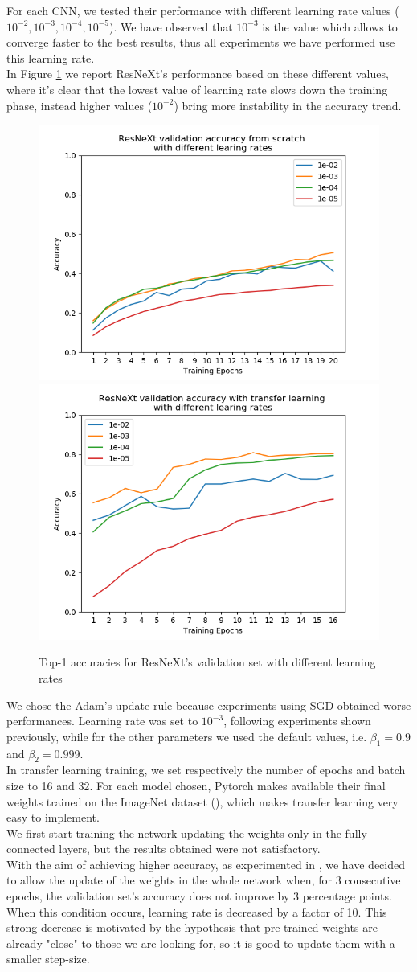 \documentclass{article}
\begin{document}
For each CNN, we tested their performance with different learning rate values ($10^{-2}, 10^{-3}, 10^{-4}, 10^{-5}$). We have observed that $10^{-3}$ is the value which allows to converge faster to the best results, thus all experiments we have performed use this learning rate.\\
In Figure \ref{fig:lr} we report ResNeXt's performance based on these different values, where it's clear that the lowest value of learning rate slows down the training phase, instead higher values ($10^{-2}$) bring more instability in the accuracy trend.
\begin{figure}[h]
	\centering
	\includegraphics[width=.5\textwidth]{graphs/lr_scratch}\hfill
	\includegraphics[width=.5\textwidth]{graphs/lr_tl}
	\caption{Top-1 accuracies for ResNeXt's validation set with different learning rates}
	\label{fig:lr}
\end{figure}
We chose the Adam's update rule because experiments using SGD obtained worse performances. Learning rate was set to $10^{-3}$, following experiments shown previously, while for the other parameters we used the default values, i.e. $\beta_{1}  = 0.9$ and $\beta_{2} = 0.999$.\\
In transfer learning training, we set respectively the number of epochs and batch size to 16 and 32.  For each model chosen, Pytorch makes available their final weights  trained on the ImageNet dataset (\cite{imagenet}), which makes transfer learning very easy to implement.\\
We first start training the network updating the weights only in the fully-connected layers, but the results obtained were not satisfactory.\\
With the aim of achieving higher accuracy, as experimented in \cite{ArtistIdCNN406}, we have decided to allow the update of the weights in the whole network when, for 3 consecutive epochs, the validation set's accuracy does not improve by 3 percentage points. When this condition occurs, learning rate is decreased by a factor of 10. This strong decrease is motivated by the hypothesis  that pre-trained weights are already "close" to those we are looking for, so it is good to update them with a smaller step-size.
\end{document}
